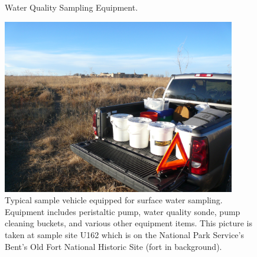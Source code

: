 \begin{linenumbers}
\begin{figure}[htbp]
	\centering
	\hspace{4em}%
	\caption[Water Quality Sampling Equipment.]{Water Quality Sampling Equipment.}
	\label{fig:WQEquipment}
\end{figure}

\begin{figure}
	\centering
	\includegraphics[width=4in]{Figures/Photo/SampleVehicle}
	\caption[Typical sample vehicle equipped for surface water sampling.]{Typical sample vehicle equipped for surface water sampling.  Equipment includes peristaltic pump, water quality sonde, pump cleaning buckets, and various other equipment items.  This picture is taken at sample site U162 which is on the National Park Service's Bent's Old Fort National Historic Site (fort in background).}
	\label{pic:SampleVehicle}
\end{figure}	


\end{linenumbers}
